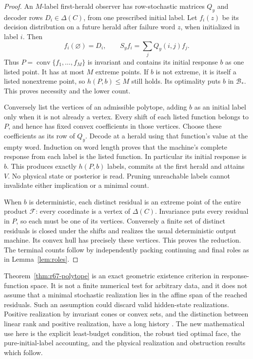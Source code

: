 \begin{proof}
An $M$-label first-herald observer has row-stochastic matrices $Q_y$ and decoder rows $D_i\in\Delta(C)$, from one prescribed initial label. Let $f_i(z)$ be its decision distribution on a future herald after failure word $z$, when initialized in label $i$. Then
\[
 f_i(\varnothing)=D_i,\qquad S_yf_i=\sum_j Q_y(i,j)f_j.
\]
Thus $P=\operatorname{conv}\{f_1,\ldots,f_M\}$ is invariant and contains its initial response $b$ as one listed point. It has at most $M$ extreme points. If $b$ is not extreme, it is itself a listed nonextreme point, so $h(P,b)\le M$ still holds. Its optimality puts $b$ in $\mathcal B_*$. This proves necessity and the lower count.

Conversely list the vertices of an admissible polytope, adding $b$ as an initial label only when it is not already a vertex. Every shift of each listed function belongs to $P$, and hence has fixed convex coefficients in those vertices. Choose these coefficients as its row of $Q_y$. Decode at a herald using that function's value at the empty word. Induction on word length proves that the machine's complete response from each label is the listed function. In particular its initial response is $b$. This produces exactly $h(P,b)$ labels, commits at the first herald and attains $V$. No physical state or posterior is read. Pruning unreachable labels cannot invalidate either implication or a minimal count.

When $b$ is deterministic, each distinct residual is an extreme point of the entire product $\mathcal F$: every coordinate is a vertex of $\Delta(C)$. Invariance puts every residual in $P$, so each must be one of its vertices. Conversely a finite set of distinct residuals is closed under the shifts and realizes the usual deterministic output machine. Its convex hull has precisely these vertices. This proves the reduction. The terminal counts follow by independently packing continuing and final roles as in Lemma~\ref{lem:roles}.
\end{proof}

Theorem~\ref{thm:r67-polytope} is an exact geometric existence criterion in response-function space. It is not a finite numerical test for arbitrary data, and it does not assume that a minimal stochastic realization lies in the affine span of the reached residuals. Such an assumption could discard valid hidden-state realizations. Positive realization by invariant cones or convex sets, and the distinction between linear rank and positive realization, have a long history \cite{Heller65,CarlylePaz71}. The new mathematical use here is the explicit least-budget condition, the robust tied optimal face, the pure-initial-label accounting, and the physical realization and obstruction results which follow.

